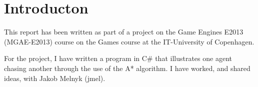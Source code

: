 \section{Introducton}
\label{01}

This report has been written as part of a project on the Game Engines E2013 (MGAE-E2013) course on the Games course at the IT-University of Copenhagen. 

For the project, I have written a program in C\# that illustrates one agent chasing another through the use of the A* algorithm. I have worked, and shared ideas, with Jakob Melnyk (jmel). 